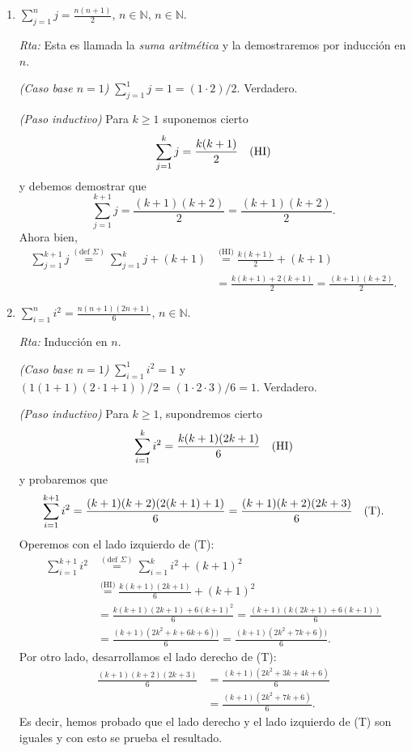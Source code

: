 \documentclass[a4paper,12pt,twoside,spanish,reqno]{amsbook}
\numberwithin{equation}{section}
\newcommand{\rta}{\noindent\textit{Rta: }}
\begin{document}
\begin{enumerate}
\begin{enumerate}
            
            \item\label{ej-serie-aritmetica}  $\displaystyle{ \sum_{j=1}^n j = \frac{n(n+1)}{2}}$, $n\in \mathbb N$, $n\in \mathbb N$.
            
            \rta Esta es llamada la \textit{suma aritmética} y la demostraremos por inducción en $n$.
            
            \textit{(Caso base $n=1$) } $ \sum_{j=1}^1 j = 1 = (1 \cdot 2)/2$. Verdadero. 
            
            \textit{(Paso inductivo) } Para $k \ge 1$ suponemos cierto $$\sum_{j=1}^k j = \frac{k(k+1)}{2} \text{\quad (HI)}$$  y  debemos demostrar  que $$\sum_{j=1}^{k+1} j = \frac{(k+1)(k+2)}{2} = \frac{(k+1)(k+2)}{2}.$$ Ahora bien,
            \begin{align*}
                \sum_{j=1}^{k+1} j \overset{(\text{def } \Sigma)}{=} \sum_{j=1}^k j + (k+1)&  \overset{\text{(HI)}}{=} \frac{k(k+1)}{2} + (k+1) \\&= \frac{k(k+1) +2(k+1)}{2} = \frac{(k+1)(k +2)}{2}. 
            \end{align*}
            
            \item\label{ej-sum-i2}  $\displaystyle{ \sum_{i=1}^n i^2 = \frac{n(n+1)(2n+1)}{6}}$, $n\in \mathbb N$.
            
            \rta Inducción en $n$.
            
            \textit{(Caso base $n=1$) } $ \sum_{i=1}^1 i^2 = 1$ y $(1  (1+1)  (2\cdot 1 + 1))/2 = (1 \cdot 2 \cdot 3)/6=1$. Verdadero.  
            
            \textit{(Paso inductivo) } Para  $k \ge 1$,  supondremos cierto 
            $$\sum_{i=1}^{k} i^2 = \frac{k(k+1)(2k+1)}{6} \text{\quad (HI)}$$
            y probaremos que 
            $$\sum_{i=1}^{k+1} i^2 = \frac{(k+1)(k+2)(2(k+1)+1)}{6} = \frac{(k+1)(k+2)(2k+3)}{6} \text{\quad (T)}.$$ 
            Operemos con el lado izquierdo de (T):
            \begin{align*}
            \sum_{i=1}^{k+1} i^2 &\overset{(\text{def } \Sigma)}{=} \sum_{i=1}^{k} i^2 + (k+1)^2 \\ &\overset{\text{(HI)}}{=} \frac{k(k+1)(2k+1)}{6}  + (k+1)^2 \\ &=   \frac{k(k+1)(2k+1) + 6(k+1)^2}{6} = \frac{(k+1)(k(2k+1) + 6(k+1))}{6} \\ &= \frac{(k+1)(2k^2+k + 6k+6))}{6} =  \frac{(k+1)(2k^2+7k+6))}{6}.
            \end{align*}
            Por otro lado,  desarrollamos el lado derecho de (T): 
            \begin{align*}
                \frac{(k+1)(k+2)(2k+3)}{6} &= \frac{(k+1)(2k^2+3k +4k +6)}{6} \\&= \frac{(k+1)(2k^2+7k +6)}{6}.
            \end{align*}
            Es decir,  hemos probado que el lado derecho y el lado izquierdo de (T) son iguales y con esto se prueba el resultado. 
            

\end{enumerate}
\end{enumerate}
\end{document}
